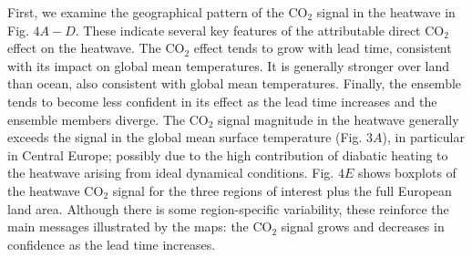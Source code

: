   First, we examine the geographical pattern of the CO$_2$ signal in the heatwave in Fig. $4A-D$. These indicate several key features of the attributable direct CO$_2$ effect on the heatwave. The CO$_2$ effect tends to grow with lead time, consistent with its impact on global mean temperatures. It is generally stronger over land than ocean, also consistent with global mean temperatures. Finally, the ensemble tends to become less confident in its effect as the lead time increases and the ensemble members diverge. The CO$_2$ signal magnitude in the heatwave generally exceeds the signal in the global mean surface temperature (Fig. $3A$), in particular in Central Europe; possibly due to the high contribution of diabatic heating to the heatwave arising from ideal dynamical conditions. Fig. $4E$ shows boxplots of the heatwave CO$_2$ signal for the three regions of interest plus the full European land area. Although there is some region-specific variability, these reinforce the main messages illustrated by the maps: the CO$_2$ signal grows and decreases in confidence as the lead time increases.

